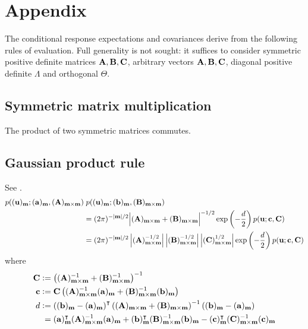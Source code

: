 \documentclass[a4paper, margin=1in, reqno]{RAMArticle}
\begin{document}
\section{Appendix}
	The conditional response expectations and covariances derive from the following rules of evaluation.
	Full generality is not sought: it suffices to consider symmetric positive definite matrices \(\mathbf{A},\mathbf{B},\mathbf{C}\), arbitrary vectors \(\mathbf{A},\mathbf{B},\mathbf{C}\), diagonal positive definite \(\Lambda\) and orthogonal \(\Theta\).

	\subsection{Symmetric matrix multiplication}\label{sub:App:SMM}
		The product of two symmetric matrices commutes.

	\subsection{Gaussian product rule}\label{sub:App:GPR} 
		See \cite{Roweis1999,Rasmussen2016,Schoen.Lindsten2018}.
		\begin{align*}
			p\!\left((\mathbf{u})_{\mathbf{m}} ; (\mathbf{a})_{\mathbf{m}},(\mathbf{A})_{\mathbf{m}\times\mathbf{m}}\right) &
			\; p\!\left((\mathbf{u})_{\mathbf{m}} ; (\mathbf{b})_{\mathbf{m}},(\mathbf{B})_{\mathbf{m}\times\mathbf{m}}\right) \\
			&= (2 \pi)^{-\left\lvert\mathbf{m}\right\rvert/2}
			\Big\lvert(\mathbf{A})_{\mathbf{m}\times\mathbf{m}} + (\mathbf{B})_{\mathbf{m}\times\mathbf{m}}\Big\rvert^{-1/2}
				\exp\left( -\frac{d}{2}\right) p(\mathbf{u} ; \mathbf{c},\mathbf{C}) \\
			&= (2 \pi)^{-\left\lvert\mathbf{m}\right\rvert/2}\left\lvert(\mathbf{A})_{\mathbf{m}\times\mathbf{m}}^{-1/2}\right\rvert 
				\left\lvert(\mathbf{B})_{\mathbf{m}\times\mathbf{m}}^{-1/2}\right\rvert
				\left\lvert(\mathbf{C})_{\mathbf{m}\times\mathbf{m}}^{1/2}\right\rvert
				\exp\left( -\frac{d}{2} \right) p(\mathbf{u} ; \mathbf{c},\mathbf{C})
		\end{align*}
		where
		\begin{align*}
			\mathbf{C} &\mathrel{\mathop:}= \left((\mathbf{A})_{\mathbf{m}\times\mathbf{m}}^{-1} + (\mathbf{B})_{\mathbf{m}\times\mathbf{m}}^{-1}\right)^{-1} \\
			\mathbf{c} &\mathrel{\mathop:}= \mathbf{C}\left((\mathbf{A})_{\mathbf{m}\times\mathbf{m}}^{-1} (\mathbf{a})_{\mathbf{m}} 
				+ (\mathbf{B})_{\mathbf{m}\times\mathbf{m}}^{-1} (\mathbf{b})_{\mathbf{m}}\right) \\
			d &\mathrel{\mathop:}= \left((\mathbf{b})_{\mathbf{m}}-(\mathbf{a})_{\mathbf{m}}\right)^{\intercal} \left((\mathbf{A})_{\mathbf{m}\times\mathbf{m}} + (\mathbf{B})_{\mathbf{m}\times\mathbf{m}}\right)^{-1} \left((\mathbf{b})_{\mathbf{m}}-(\mathbf{a})_{\mathbf{m}}\right) \\
			&\phantom{:}= 
				(\mathbf{a})_{\mathbf{m}}^{\intercal} (\mathbf{A})_{\mathbf{m}\times\mathbf{m}}^{-1} (\mathbf{a})_{\mathbf{m}}
				+ (\mathbf{b})_{\mathbf{m}}^{\intercal} (\mathbf{B})_{\mathbf{m}\times\mathbf{m}}^{-1} (\mathbf{b})_{\mathbf{m}}
				- (\mathbf{c})_{\mathbf{m}}^{\intercal} (\mathbf{C})_{\mathbf{m}\times\mathbf{m}}^{-1} (\mathbf{c})_{\mathbf{m}}
		\end{align*}
\end{document}
